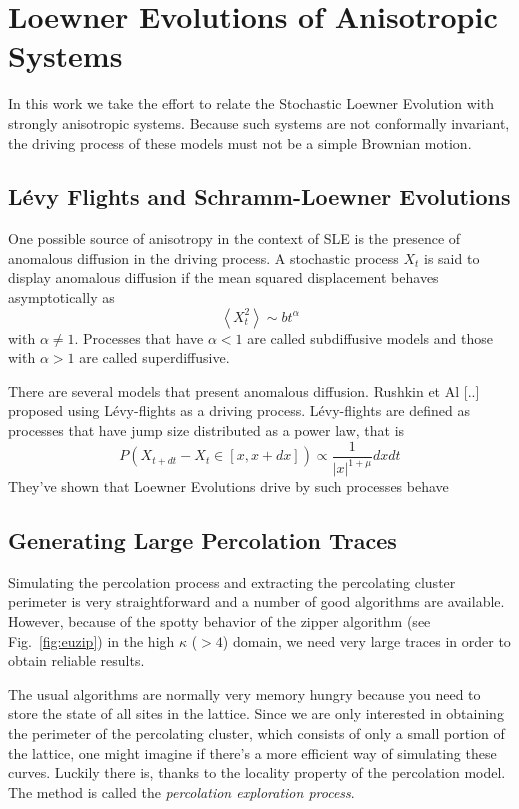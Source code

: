 \chapter{Loewner Evolutions of Anisotropic Systems}
\label{ch6-asle}

In this work we take the effort to relate the Stochastic Loewner Evolution with
strongly anisotropic systems. Because such systems are not conformally
invariant, the driving process of these models must not be a simple Brownian
motion.

\section{Lévy Flights and Schramm-Loewner Evolutions}

One possible source of anisotropy in the context of SLE is the presence of
anomalous diffusion in the driving process. A stochastic process $X_t$ is
said to display anomalous diffusion if the mean squared displacement
behaves asymptotically as
\begin{equation}
    \left\langle X_t^2 \right\rangle \sim bt^\alpha
\end{equation}
with $\alpha\neq 1$. Processes that have $\alpha < 1$ are called subdiffusive
models and those with $\alpha > 1$ are called superdiffusive.

There are several models that present anomalous diffusion. Rushkin et Al [..]
proposed using L\'evy-flights as a driving process. L\'evy-flights are defined as
processes that have jump size distributed as a power law, that is
\begin{equation}
    P(X_{t+dt} - X_t \in [x, x+dx]) \propto \frac{1}{|x|^{1+\mu}}dxdt
\end{equation}
They've shown that Loewner Evolutions drive by such processes behave


\section{Generating Large Percolation Traces}
\label{sec:hulls}

Simulating the percolation process and extracting the percolating cluster
perimeter is very straightforward and a number of good algorithms are
available. However, because of the spotty behavior of the zipper algorithm
(see Fig.~\ref{fig:euzip}) in the high $\kappa$ ($>4$) domain, we need very
large traces in order to obtain reliable results.

The usual algorithms are normally very memory hungry because you need to store
the state of all sites in the lattice. Since we are only interested in
obtaining the perimeter of the percolating cluster, which consists of only a
small portion of the lattice, one might imagine if there's a more efficient way
of simulating these curves. Luckily there is, thanks to the locality property
of the percolation model. The method is called the \textit{percolation
exploration process}.

